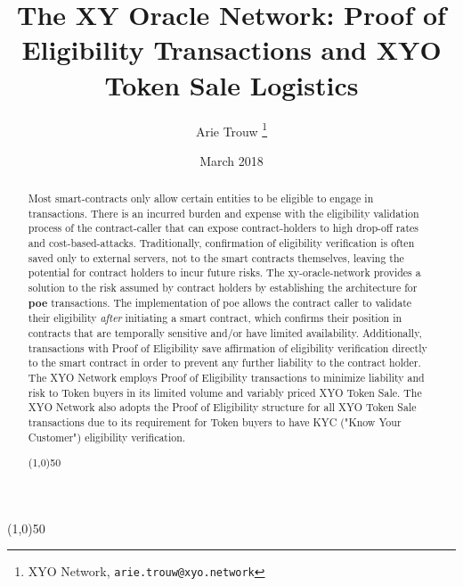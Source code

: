 \documentclass{article}
\title {The XY Oracle Network: Proof of Eligibility Transactions and XYO Token Sale Logistics}
\author{
    Arie Trouw
        \thanks{XYO Network, \texttt{arie.trouw@xyo.network}}
}
\date{March 2018}
\begin{document}
\maketitle

\begin{center}
\line(1,0){50}
\end{center}

\begin{abstract}
Most \glspl{smart-contract} only allow certain entities to be eligible to engage in \glspl{transaction}. There is an incurred burden and expense with the eligibility validation process of the \gls{contract-caller} that can expose \glspl{contract-holder} to high drop-off rates and \glspl{cost-based-attack}. Traditionally, confirmation of eligibility verification is often saved only to external servers, not to the smart contracts themselves, leaving the potential for contract holders to incur future risks. The \Gls{xy-oracle-network} provides a solution to the risk assumed by contract holders by establishing the architecture for \textbf{\Gls{poe}} transactions. The implementation of \acrshort{poe} allows the contract caller to validate their eligibility \textit{after} initiating a smart contract, which confirms their position in contracts that are temporally sensitive and/or have limited availability. Additionally, transactions with Proof of Eligibility save affirmation of eligibility verification directly to the smart contract in order to prevent any further liability to the contract holder. The XYO Network employs Proof of Eligibility transactions to minimize liability and risk to Token buyers in its limited volume and variably priced XYO Token Sale. The XYO Network also adopts the Proof of Eligibility structure for all XYO Token Sale transactions due to its requirement for Token buyers to have KYC ("Know Your Customer") eligibility verification.

\begin{center}
\line(1,0){50}
\end{center}
\end{abstract}

\end{document}
